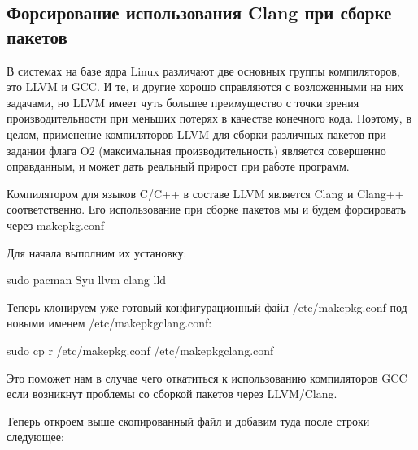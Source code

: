\documentclass[letterpaper,10pt,russian,openany]{sphinxmanual}
\begin{document}
\ignorespaces 

\subsection{Форсирование использования Clang при сборке пакетов}
\label{\detokenize{source/generic-system-acceleration:clang}}\label{\detokenize{source/generic-system-acceleration:force-clang-usage}}\label{\detokenize{source/generic-system-acceleration:index-1}}
\sphinxAtStartPar
В системах на базе ядра Linux различают две основных группы компиляторов, это LLVM и GCC.
И те, и другие хорошо справляются с возложенными на них задачами,
но LLVM имеет чуть большее преимущество с точки зрения производительности при меньших потерях в качестве конечного кода.
Поэтому, в целом, применение компиляторов LLVM для сборки различных пакетов при задании флага \sphinxhyphen{}O2
(максимальная производительность) является совершенно оправданным, и может дать реальный прирост при работе программ.

\sphinxAtStartPar
Компилятором для языков C/C++ в составе LLVM является Clang и Clang++ соответственно.
Его использование при сборке пакетов мы и будем форсировать через makepkg.conf

\sphinxAtStartPar
Для начала выполним их установку:

\begin{sphinxVerbatim}[commandchars=\\\{\}]
sudo pacman \PYGZhy{}Syu llvm clang lld
\end{sphinxVerbatim}

\sphinxAtStartPar
Теперь клонируем уже готовый конфигурационный файл /etc/makepkg.conf под новыми именем /etc/makepkg\sphinxhyphen{}clang.conf:

\begin{sphinxVerbatim}[commandchars=\\\{\}]
sudo cp \PYGZhy{}r /etc/makepkg.conf /etc/makepkg\PYGZhy{}clang.conf
\end{sphinxVerbatim}

\sphinxAtStartPar
Это поможет нам в случае чего откатиться к использованию компиляторов GCC если возникнут проблемы со сборкой пакетов через LLVM/Clang.

\sphinxAtStartPar
Теперь откроем выше скопированный файл и добавим туда после строки  следующее:
\end{document}
